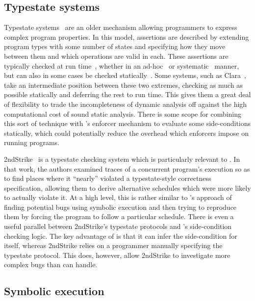 \subsection{Typestate systems}

Typestate systems~\cite{Strom1986a} are an older mechanism allowing
programmers to express complex program properties.  In this model,
assertions are described by extending program types with some number
of states and specifying how they move between them and which
operations are valid in each.  These assertions are typically checked
at run time~\cite{Wolff2011}, whether in an
ad-hoc~\cite[pages~305--314]{Gamma1995} or
systematic~\cite{Aldrich2009} manner, but can also in some cases be
checked statically~\cite{Lam2005}.  Some systems, such as
Clara~\cite{Bodden2010}, take an intermediate position between these
two extremes, checking as much as possible statically and deferring
the rest to run time.  This gives them a great deal of flexibility to
trade the incompleteness of dynamic analysis off against the high
computational cost of sound static analysis.  There is some scope for
combining this sort of technique with {\technique}'s enforcer
mechanism to evaluate some side-conditions statically, which could
potentially reduce the overhead which enforcers impose on running
programs.

2ndStrike~\cite{Gao2011} is a typestate checking system which is
particularly relevant to {\technique}.  In that work, the authors
examined traces of a concurrent program's execution so as to find
places where it ``nearly'' violated a typestate-style correctness
specification, allowing them to derive alternative schedules which
were more likely to actually violate it.  At a high level, this is
rather similar to {\technique}'s approach of finding potential bugs
using symbolic execution and then trying to reproduce them by forcing
the program to follow a particular schedule.  There is even a useful
parallel between 2ndStrike's typestate protocols and {\technique}'s
side-condition checking logic.  The key advantage of {\technique} is
that it can infer the side-condition for itself, whereas 2ndStrike
relies on a programmer manually specifying the typestate protocol.
This does, however, allow 2ndStrike to investigate more complex bugs
than {\technique} can handle.

\subsection{Symbolic execution}

